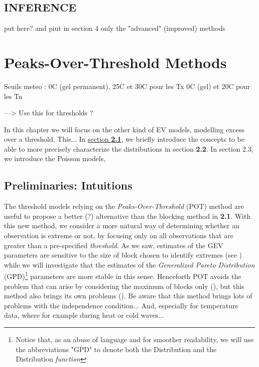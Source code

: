 \documentclass[11pt,a4paper,openany ]{book}
\begin{document}
\section{INFERENCE} put here?
and piut in section 4 only the "advanced" (improved) methods


\chapter{Peaks-Over-Threshold Methods}\label{sec::2}
\minitoc \thispagestyle{empty}
 \vspace{1.5cm}

Seuils meteo : 0C (gel permanent), 25C et 30C pour les Tx
0C (gel) et 20C pour les Tn

---> Use this for thresholds ?

In this chapter we will focus on the other kind of EV models, modelling excess over a 
threshold. This...
In \hyperref[sec::2.1]{section \textbf{2.1}}, we briefly introduce the concepts to be able 
to more precisely characterize
 the distributions in section \textbf{2.2}. In section 2.3, we introduce the Poisson 
 models, 
 
 \newpage
\section{Preliminaries: Intuitions}\label{sec::2.1}

The threshold models relying on the \emph{Peaks-Over-Threshold} (POT) method are useful to propose a better (?) alternative than the blocking method in \textbf{2.1}. With this new method, we consider a more natural way of determining whether an observation is extreme or not, by focusing only on all observations that are greater than a pre-specified \emph{threshold}. As we saw, estimates of the GEV parameters are sensitive to the size of block chosen to identify extremes (see ) while we will investigate that the estimates of the \emph{Generalized Pareto Distribution} (GPD)\footnote{Notice that, as an abuse of language and for smoother readability, we will use the abbreviations "GPD" to denote both the Distribution and the Distribution \emph{function} } parameters are more stable in this sense. Henceforth POT avoids the problem that can arise by considering the maximum of blocks only (), but this method also brings its own problems (). Be aware that this method brings lots of problems with the independence condition... And, especially for temperature data, where for example during heat or cold waves...
\newline
\end{document}
